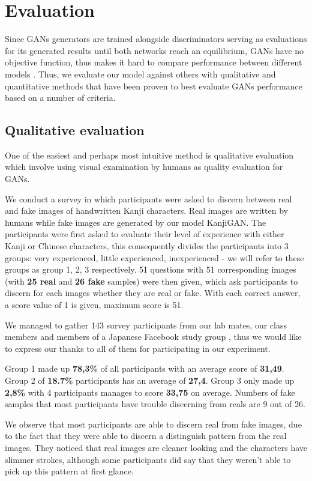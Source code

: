 \documentclass[12pt]{report}
\begin{document}
\section{Evaluation}
Since GANs generators are trained alongside discriminators serving as evaluations for its generated results until both networks reach an equilibrium, GANs have no objective function, thus makes it hard to compare performance between different models \cite{training-gans}.
Thus, we evaluate our model against others with qualitative and quantitative methods that have been proven to best evaluate GANs performance based on a number of criteria\cite{gan-measure}.

\subsection{Qualitative evaluation}
One of the easiest and perhaps most intuitive method is qualitative evaluation which involve using visual examination by humans as quality evaluation for GANs. 

We conduct a survey in which participants were asked to discern between real and fake images of handwritten Kanji characters. Real images are written by humans while fake images are generated by our model KanjiGAN. The participants were first asked to evaluate their level of experience with either Kanji or Chinese characters, this consequently divides the participants into 3 groups: very experienced, little experienced, inexperienced -  we will refer to these groups as group 1, 2, 3 respectively. 51 questions with 51 corresponding images (with \textbf{25 real} and \textbf{26 fake} samples) were then given, which ask participants to discern for each images whether they are real or fake. With each correct answer, a score value of 1 is given, maximum score is 51.

We managed to gather 143 survey participants from our lab mates, our class members and members of a Japanese Facebook study group \cite{fb-group}, thus we would like to express our thanks to all of them for participating in our experiment. 

Group 1 made up \textbf{78,3\%} of all participants with an average score of \textbf{31,49}. Group 2 of \textbf{18.7\%} participants has an average of \textbf{27,4}. Group 3 only made up \textbf{2,8\%} with 4 participants manages to score \textbf{33,75} on average. Numbers of fake samples that most participants have trouble discerning from reals are 9 out of 26.

We observe that most participants are able to discern real from fake images, due to the fact that they were able to discern a distinguish pattern from the real images. They noticed that real images are cleaner looking and the characters have slimmer strokes, although some participants did say that they weren't able to pick up this pattern at first glance.
\end{document}
